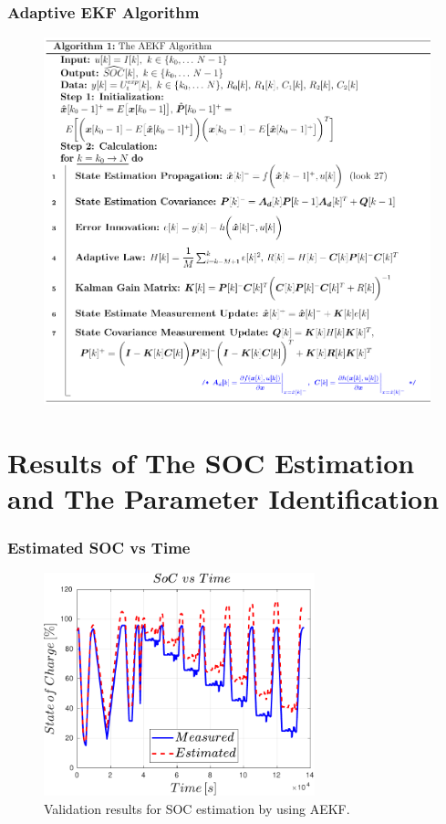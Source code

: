 \documentclass{beamer}
\begin{document}
\begin{frame}
	
	\frametitle{Adaptive EKF Algorithm}
	
	\begin{figure}
		\centering
		\includegraphics[height=0.75\textwidth, keepaspectratio]{images/AEKF_Algorithm.pdf}
		\label{fig:AEKF_Algorithm}
	\end{figure}
	
\end{frame}

\section{Results of The SOC Estimation and The Parameter Identification}

\begin{frame}
	
	\frametitle{Estimated SOC vs Time}
	
	\begin{figure}
		\centering
		\includegraphics[width=0.7\textwidth, keepaspectratio]{images/AEKF_SOC.pdf}
		\caption{Validation results for SOC estimation by using AEKF.}
		\label{fig:The_AEKF_SOC}
	\end{figure}
	
\end{frame}
\end{document}
